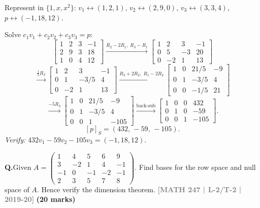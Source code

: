 \documentclass[12pt,a3paper]{article}
\newcommand{\yr}[1]{\hfill\textcolor{gray}{\small\textbf{[#1]}}}
\newcommand{\mk}[1]{\textcolor{orange!70!black}{\small\textbf{(#1 marks)}}}
\newcounter{qnum}
\newcommand{\Q}[1]{%
  \needspace{4\baselineskip}
  \refstepcounter{qnum}
  \vspace{6pt}
  \noindent\textbf{Q\theqnum.}\enspace #1\par
}
\begin{document}
\begin{tcolorbox}[enhanced,breakable,
  colback=cC!4,colframe=cC,boxrule=0.8pt,arc=5pt,
  title={\textbf{Answer --- Coordinate Vector of $p=-1+18x+12x^2$ relative to $S$}},
  fonttitle=\bfseries\color{white},colbacktitle=cC]

Represent in $\{1,x,x^2\}$: $v_1\leftrightarrow(1,2,1)$, $v_2\leftrightarrow(2,9,0)$, $v_3\leftrightarrow(3,3,4)$, $p\leftrightarrow(-1,18,12)$.

Solve $c_1 v_1+c_2 v_2+c_3 v_3=p$:
\[
\left[\begin{array}{ccc|c}1&2&3&-1\\2&9&3&18\\1&0&4&12\end{array}\right]
\xrightarrow{R_2-2R_1,\;R_3-R_1}
\left[\begin{array}{ccc|c}1&2&3&-1\\0&5&-3&20\\0&-2&1&13\end{array}\right]
\]
\[
\xrightarrow{\frac{1}{5}R_2}
\left[\begin{array}{ccc|c}1&2&3&-1\\0&1&-3/5&4\\0&-2&1&13\end{array}\right]
\xrightarrow{R_3+2R_2,\;R_1-2R_2}
\left[\begin{array}{ccc|c}1&0&21/5&-9\\0&1&-3/5&4\\0&0&-1/5&21\end{array}\right]
\]
\[
\xrightarrow{-5R_3}
\left[\begin{array}{ccc|c}1&0&21/5&-9\\0&1&-3/5&4\\0&0&1&-105\end{array}\right]
\xrightarrow{\text{back-sub}}
\left[\begin{array}{ccc|c}1&0&0&432\\0&1&0&-59\\0&0&1&-105\end{array}\right].
\]
\[
\boxed{[p]_S = (432,\,-59,\,-105).}
\]
\textit{Verify:} $432v_1-59v_2-105v_3=(-1,18,12)$.\;\checkmark

\end{tcolorbox}

\Q{Given $A = \begin{pmatrix} 1 & 4 & 5 & 6 & 9 \\ 3 & -2 & 1 & 4 & -1 \\ -1 & 0 & -1 & -2 & -1 \\ 2 & 3 & 5 & 7 & 8 \end{pmatrix}$. Find bases for the row space and null space of $A$. Hence verify the dimension theorem.
\yr{MATH 247 | L-2/T-2 | 2019-20} \mk{20}}
\end{document}
